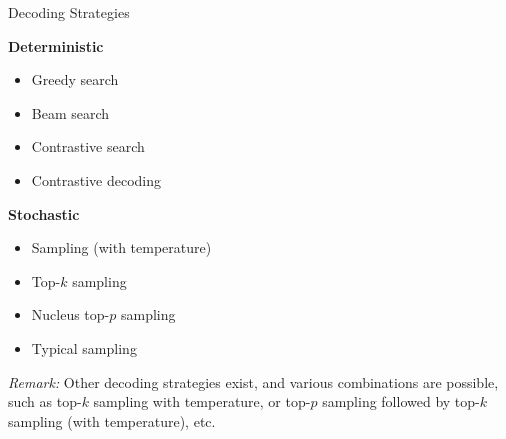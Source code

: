 \documentclass[11pt,compress,t,notes=noshow, xcolor=table]{beamer}
\begin{document}
\begin{frame}{Decoding Strategies}

\textbf{Deterministic}
\begin{itemize}
    \item Greedy search
    \item Beam search
    \item Contrastive search 
    \item Contrastive decoding 
\end{itemize}

\textbf{Stochastic}
\begin{itemize}
    \item Sampling (with temperature) 
    \item Top-$k$ sampling 
    \item Nucleus top-$p$ sampling 
    \item Typical sampling 
\end{itemize}
\vspace{1ex}

\textit{Remark:} Other decoding strategies exist, and various combinations are possible, such as top-$k$ sampling with temperature, or top-$p$ sampling followed by top-$k$ sampling (with temperature), etc.

\end{frame}


\endlecture
\end{document}
